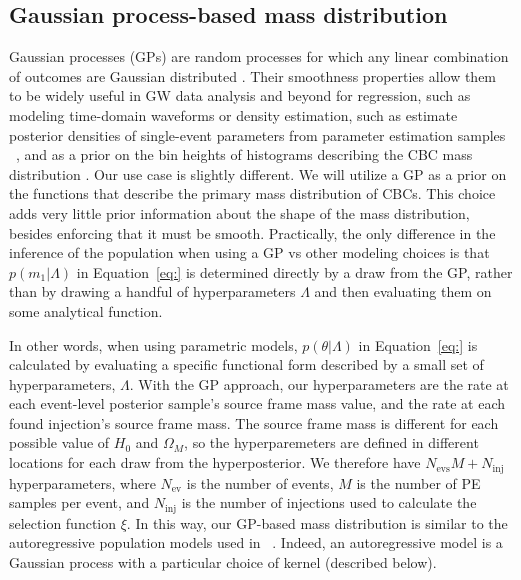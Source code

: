 \documentclass[]{aastex631}
\newcommand{\Ho}{$H_0$}
\newcommand{\Omm}{$\Omega_M$}
\begin{document}
\subsection{Gaussian process-based mass distribution}
\label{sec:model}
Gaussian processes (GPs) are random processes for which any linear combination of outcomes are Gaussian distributed \citep{rasmussen_gaussian_2006}.
Their smoothness properties allow them to be widely useful in GW data analysis and beyond for regression, such as modeling time-domain waveforms \citep{zoheyr, others} or density estimation, such as estimate posterior densities of single-event parameters from parameter estimation samples ~\citep{dangelo}, and as a prior on the bin heights of histograms describing the CBC mass distribution \citep{ray_2023}.
Our use case is slightly different.
We will utilize a GP as a prior on the functions that describe the primary mass distribution of CBCs.
This choice adds very little prior information about the shape of the mass distribution, besides enforcing that it must be smooth.
Practically, the only difference in the inference of the population when using a GP vs other modeling choices is that $p(m_1|\Lambda)$ in Equation~\ref{eq:} is determined directly by a draw from the GP, rather than by drawing a handful of hyperparameters $\Lambda$ and then evaluating them on some analytical function.

In other words, when using parametric models, $p(\theta|\Lambda)$ in Equation~\ref{eq:} is calculated by evaluating a specific functional form described by a small set of hyperparameters, $\Lambda$. 
With the GP approach, our hyperparameters are the rate at each event-level posterior sample's source frame mass value, and the rate at each found injection's source frame mass.
The source frame mass is different for each possible value of \Ho{} and \Omm{}, so the hyperparemeters are defined in different locations for each draw from the hyperposterior. %
We therefore have $N_{\text{evs}}M + N_{\text{inj}}$ hyperparameters, where $N_{\text{ev}}$ is the number of events, $M$ is the number of PE samples per event, and $N_{\text{inj}}$ is the number of injections used to calculate the selection function $\xi$.
In this way, our GP-based mass distribution is similar to the autoregressive population models used in ~\citet{callister_ar_paper}.
Indeed, an autoregressive model is a Gaussian process with a particular choice of kernel (described below). 
\end{document}

